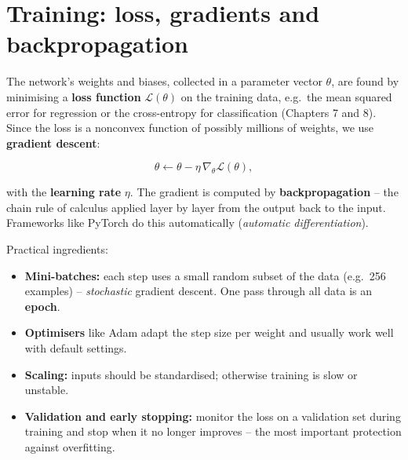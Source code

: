 \documentclass[
  letterpaper,
  DIV=11,
  numbers=noendperiod]{scrreprt}
\providecommand{\tightlist}{%
  \setlength{\itemsep}{0pt}\setlength{\parskip}{0pt}}\usepackage{longtable,booktabs,array}
\begin{document}
\section{Training: loss, gradients and
backpropagation}\label{training-loss-gradients-and-backpropagation}

The network's weights and biases, collected in a parameter vector
\(\theta\), are found by minimising a \textbf{loss function}
\(\mathcal{L}(\theta)\) on the training data, e.g.~the mean squared
error for regression or the cross-entropy for classification (Chapters 7
and 8). Since the loss is a nonconvex function of possibly millions of
weights, we use \textbf{gradient descent}:

\[\theta \leftarrow \theta - \eta\,\nabla_\theta \mathcal{L}(\theta),\]

with the \textbf{learning rate} \(\eta\). The gradient is computed by
\textbf{backpropagation} -- the chain rule of calculus applied layer by
layer from the output back to the input. Frameworks like PyTorch do this
automatically (\emph{automatic differentiation}).

Practical ingredients:

\begin{itemize}
\tightlist
\item
  \textbf{Mini-batches:} each step uses a small random subset of the
  data (e.g.~256 examples) -- \emph{stochastic} gradient descent. One
  pass through all data is an \textbf{epoch}.
\item
  \textbf{Optimisers} like Adam adapt the step size per weight and
  usually work well with default settings.
\item
  \textbf{Scaling:} inputs should be standardised; otherwise training is
  slow or unstable.
\item
  \textbf{Validation and early stopping:} monitor the loss on a
  validation set during training and stop when it no longer improves --
  the most important protection against overfitting.
\end{itemize}
\end{document}
